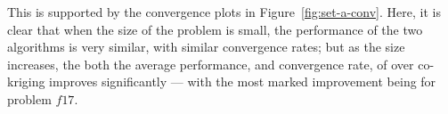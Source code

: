 This is supported by the convergence plots in Figure~\ref{fig:set-a-conv}. Here, it is clear that when the size of the problem is small, the performance of the two algorithms is very similar, with similar convergence rates; but as the size increases, the both the average performance, and convergence rate, of \AlgName{} over co-kriging improves significantly --- with the most marked improvement being for problem $f17$. 

\begin{figure}[t]
  \centering
  \\

\end{figure}
